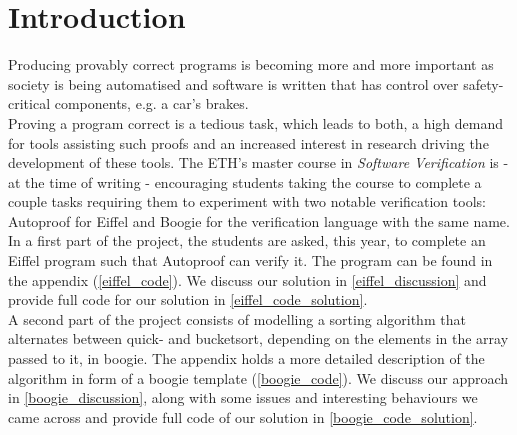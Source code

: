 \section{Introduction}
Producing provably correct programs is becoming more and more important as society is being automatised and software is written that has control over safety-critical components, e.g. a car's brakes.\\

Proving a program correct is a tedious task, which leads to both, a high demand for tools assisting such proofs and an increased interest in research driving the development of these tools. The ETH's master course in \emph{Software Verification} is - at the time of writing - encouraging students taking the course to complete a couple tasks requiring them to experiment with two notable verification tools: Autoproof\cite{autoproof} for Eiffel and Boogie\cite{boogie} for the verification language with the same name.\\

In a first part of the project, the students are asked, this year, to complete an Eiffel program such that Autoproof can verify it. The program can be found in the appendix (\ref{eiffel_code}). We discuss our solution in \autoref{eiffel_discussion} and provide full code for our solution in \autoref{eiffel_code_solution}.\\

A second part of the project consists of modelling a sorting algorithm that alternates between quick- and bucketsort, depending on the elements in the array passed to it, in boogie. The appendix holds a more detailed description of the algorithm in form of a boogie template (\ref{boogie_code}). We discuss our approach in \autoref{boogie_discussion}, along with some issues and interesting behaviours we came across and provide full code of our solution in \autoref{boogie_code_solution}.